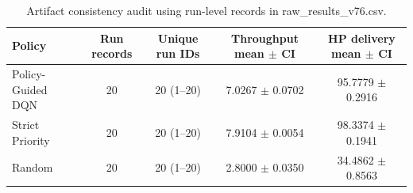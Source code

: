 \begin{table}[t]
\centering
\caption{Artifact consistency audit using run-level records in raw\_results\_v76.csv.}
\label{tab:artifact_audit}
\scriptsize
\begin{tabular}{lcccc}
\toprule
Policy & Run records & Unique run IDs & Throughput mean $\pm$ CI & HP delivery mean $\pm$ CI \\
\midrule
Policy-Guided DQN & 20 & 20 (1--20) & 7.0267 $\pm$ 0.0702 & 95.7779 $\pm$ 0.2916 \\
Strict Priority & 20 & 20 (1--20) & 7.9104 $\pm$ 0.0054 & 98.3374 $\pm$ 0.1941 \\
Random & 20 & 20 (1--20) & 2.8000 $\pm$ 0.0350 & 34.4862 $\pm$ 0.8563 \\
\bottomrule
\end{tabular}
\end{table}
